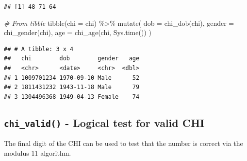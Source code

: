 \documentclass[
]{book}
\newenvironment{Shaded}{\begin{snugshade}}{\end{snugshade}}
\newcommand{\AttributeTok}[1]{\textcolor[rgb]{0.77,0.63,0.00}{#1}}
\newcommand{\CommentTok}[1]{\textcolor[rgb]{0.56,0.35,0.01}{\textit{#1}}}
\newcommand{\FunctionTok}[1]{\textcolor[rgb]{0.00,0.00,0.00}{#1}}
\newcommand{\NormalTok}[1]{#1}
\newcommand{\SpecialCharTok}[1]{\textcolor[rgb]{0.00,0.00,0.00}{#1}}
\begin{document}
\begin{verbatim}
## [1] 48 71 64
\end{verbatim}

\begin{Shaded}
\begin{Highlighting}[]
\CommentTok{\# From tibble}
\FunctionTok{tibble}\NormalTok{(}\AttributeTok{chi =}\NormalTok{ chi) }\SpecialCharTok{\%\textgreater{}\%} 
  \FunctionTok{mutate}\NormalTok{(}
    \AttributeTok{dob =} \FunctionTok{chi\_dob}\NormalTok{(chi),}
    \AttributeTok{gender =} \FunctionTok{chi\_gender}\NormalTok{(chi),}
    \AttributeTok{age =} \FunctionTok{chi\_age}\NormalTok{(chi, }\FunctionTok{Sys.time}\NormalTok{())}
\NormalTok{  )}
\end{Highlighting}
\end{Shaded}

\begin{verbatim}
## # A tibble: 3 x 4
##   chi        dob        gender   age
##   <chr>      <date>     <chr>  <dbl>
## 1 1009701234 1970-09-10 Male      52
## 2 1811431232 1943-11-18 Male      79
## 3 1304496368 1949-04-13 Female    74
\end{verbatim}

\hypertarget{chi_valid---logical-test-for-valid-chi}{%
\subsection{\texorpdfstring{\texttt{chi\_valid()} - Logical test for valid CHI}{chi\_valid() - Logical test for valid CHI}}\label{chi_valid---logical-test-for-valid-chi}}

The final digit of the CHI can be used to test that the number is correct via the modulus 11 algorithm.
\end{document}
